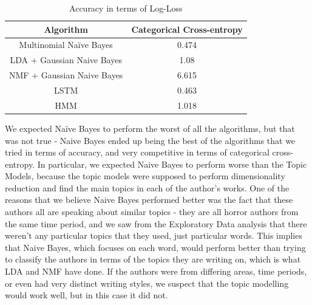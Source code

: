 \documentclass{article}
\begin{document}
\begin{table}[!ht]
    \centering
    \begin{tabular}{|c|c|}
        \hline
        Algorithm &  Categorical Cross-entropy \\
        \hline
        Multinomial Na\"ive Bayes & 0.474 \\
        LDA + Gaussian Naive Bayes& 1.08\\
        NMF + Gaussian Naive Bayes& 6.615 \\
        LSTM & 0.463 \\ 
        HMM & 1.018 \\ \hline
    \end{tabular}
    \caption{Accuracy in terms of Log-Loss}
    \label{tab:results_1}
\end{table}
We expected Na\"ive Bayes to perform the worst of all the algorithms, but that was not true - Naive Bayes ended up being the best of the algorithms that we tried in terms of accuracy, and very competitive in terms of categorical cross-entropy. In particular, we expected Naive Bayes to perform worse than the Topic Models, because the topic models were supposed to perform dimensionality reduction and find the main topics in each of the author's works. One of the reasons that we believe Naive Bayes performed better was the fact that these authors all are speaking about similar topics - they are all horror authors from the same time period, and we saw from the Exploratory Data analysis that there weren't any particular topics that they used, just particular words. This implies that Naive Bayes, which focuses on each word, would perform better than trying to classify the authors in terms of the topics they are writing on, which is what LDA and NMF have done. If the authors were from differing areas, time periods, or even had very distinct writing styles, we suspect that the topic modelling would work well, but in this case it did not. 
\end{document}
